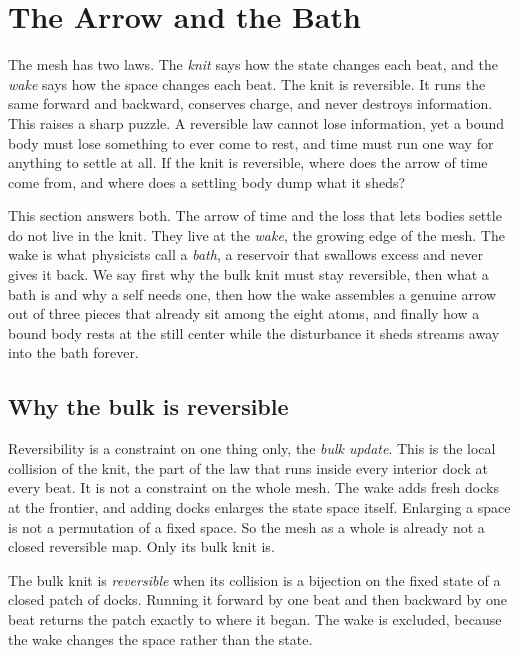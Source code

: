 \section{The Arrow and the Bath}

The mesh has two laws. The \emph{knit} says how the state changes each beat, and the \emph{wake} says how the space changes each beat. The knit is reversible. It runs the same forward and backward, conserves charge, and never destroys information. This raises a sharp puzzle. A reversible law cannot lose information, yet a bound body must lose something to ever come to rest, and time must run one way for anything to settle at all. If the knit is reversible, where does the arrow of time come from, and where does a settling body dump what it sheds?

This section answers both. The arrow of time and the loss that lets bodies settle do not live in the knit. They live at the \emph{wake}, the growing edge of the mesh. The wake is what physicists call a \emph{bath}, a reservoir that swallows excess and never gives it back. We say first why the bulk knit must stay reversible, then what a bath is and why a self needs one, then how the wake assembles a genuine arrow out of three pieces that already sit among the eight atoms, and finally how a bound body rests at the still center while the disturbance it sheds streams away into the bath forever.

\subsection{Why the bulk is reversible}

Reversibility is a constraint on one thing only, the \emph{bulk update}. This is the local collision of the knit, the part of the law that runs inside every interior dock at every beat. It is not a constraint on the whole mesh. The wake adds fresh docks at the frontier, and adding docks enlarges the state space itself. Enlarging a space is not a permutation of a fixed space. So the mesh as a whole is already not a closed reversible map. Only its bulk knit is.

\begin{definition}
The bulk knit is \emph{reversible} when its collision is a bijection on the fixed state of a closed patch of docks. Running it forward by one beat and then backward by one beat returns the patch exactly to where it began. The wake is excluded, because the wake changes the space rather than the state.
\end{definition}

